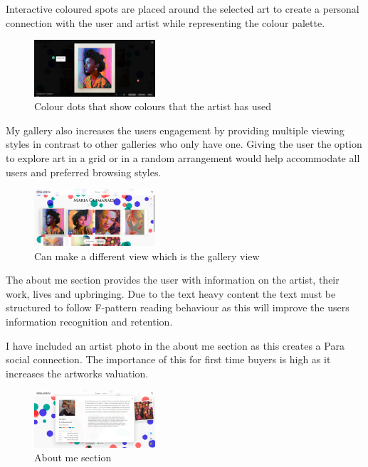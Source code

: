 \documentclass[]{project_final}
\begin{document}
Interactive coloured spots are placed around the selected art to create a personal connection with the user and artist while representing the colour palette.

\begin{figure}[ht!]
  \centering
  \includegraphics[width=0.4\textwidth]{AG32.png}
  \vspace*{0.0cm}
  \caption{Colour dots that show colours that the artist has used}
  \label{fig:1}
\end{figure}

My gallery also increases the users engagement by providing multiple viewing styles in contrast to other galleries who only have one. Giving the user the option to explore art in a grid or in a random arrangement would help accommodate all users and preferred browsing styles.

\begin{figure}[ht!]
  \centering
  \includegraphics[width=0.4\textwidth]{AG33.png}
  \vspace*{0.0cm}
  \caption{Can make a different view which is the gallery view}
  \label{fig:1}
\end{figure}

The about me section provides the user with information on the artist, their work, lives and upbringing. Due to the text heavy content the text must be structured to follow F-pattern reading behaviour as this will improve the users information recognition and retention.

I have included an artist photo in the about me section as this creates a Para social connection. The importance of this for first time buyers is high as it increases the artworks valuation.

\begin{figure}[ht!]
  \centering
  \includegraphics[width=0.4\textwidth]{AG34.png}
  \vspace*{0.0cm}
  \caption{About me section}
  \label{fig:1}
\end{figure}
\end{document}
